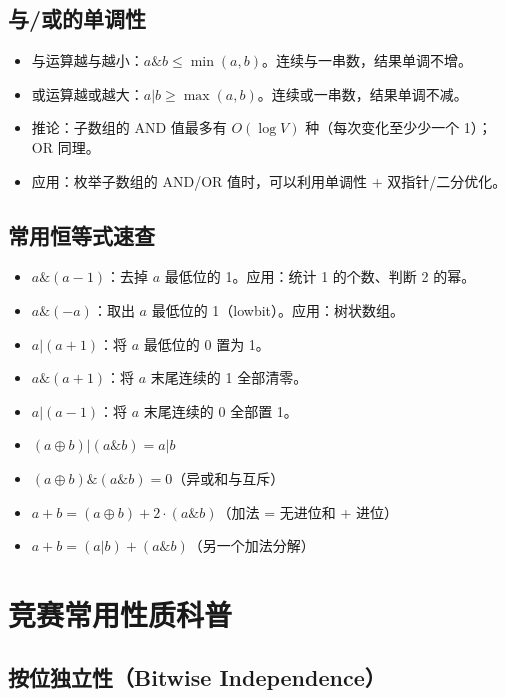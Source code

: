 \documentclass[UTF8,openany,oneside,zihao=-4]{ctexbook}
\begin{document}
\subsection{与/或的单调性}

\begin{note}
\begin{itemize}
  \item 与运算越与越小：$a \& b \le \min(a, b)$。连续与一串数，结果单调不增。
  \item 或运算越或越大：$a | b \ge \max(a, b)$。连续或一串数，结果单调不减。
  \item 推论：子数组的 AND 值最多有 $O(\log V)$ 种（每次变化至少少一个 1）；OR 同理。
  \item 应用：枚举子数组的 AND/OR 值时，可以利用单调性 + 双指针/二分优化。
\end{itemize}
\end{note}

\subsection{常用恒等式速查}

\begin{note}
\begin{itemize}
  \item $a \& (a-1)$：去掉 $a$ 最低位的 1。应用：统计 1 的个数、判断 2 的幂。
  \item $a \& (-a)$：取出 $a$ 最低位的 1（lowbit）。应用：树状数组。
  \item $a | (a+1)$：将 $a$ 最低位的 0 置为 1。
  \item $a \& (a+1)$：将 $a$ 末尾连续的 1 全部清零。
  \item $a | (a-1)$：将 $a$ 末尾连续的 0 全部置 1。
  \item $(a \oplus b) | (a \& b) = a | b$
  \item $(a \oplus b) \& (a \& b) = 0$（异或和与互斥）
  \item $a + b = (a \oplus b) + 2 \cdot (a \& b)$（加法 = 无进位和 + 进位）
  \item $a + b = (a | b) + (a \& b)$（另一个加法分解）
\end{itemize}
\end{note}

\section{竞赛常用性质科普}

\subsection{按位独立性（Bitwise Independence）}
\end{document}
